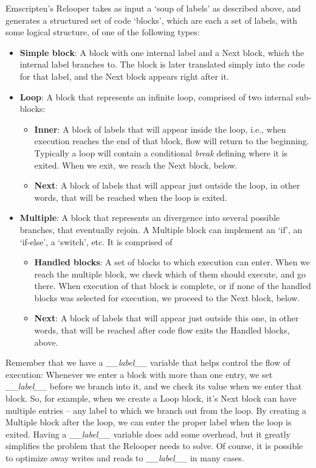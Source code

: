 \documentclass[11pt]{proc}
\begin{document}
Emscripten's Relooper takes as input a `soup of labels' as described above,
and generates a structured set of code `blocks', which are each a set of labels,
with some logical structure, of one of the following types:
\begin{itemize}
\item \textbf{Simple block}: A block with one internal label and a Next
      block, which the internal label branches to. The block is later
      translated simply into the code for that label, and the Next
      block appears right after it.
\item \textbf{Loop}: A block that represents an infinite loop, comprised of
      two internal sub-blocks:
  \begin{itemize}
  \item \textbf{Inner}: A block of labels that will appear inside
        the loop, i.e., when execution reaches the end of that block,
        flow will return to the beginning. Typically a loop will contain
        a conditional \emph{break} defining where it is exited. When we
        exit, we reach the Next block, below.
  \item \textbf{Next}: A block of labels that will appear just outside
        the loop, in other words, that will be reached when the loop is exited.
  \end{itemize}
\item \textbf{Multiple}: A block that represents an divergence into several
      possible branches, that eventually rejoin. A Multiple block can
      implement an `if', an `if-else', a `switch', etc. It is comprised of
  \begin{itemize}
  \item \textbf{Handled blocks}: A set of blocks to which execution can
        enter. When we reach the multiple block, we check which of them
        should execute, and go there. When execution of that block is
        complete, or if none of the handled blocks was selected for
        execution, we proceed to the Next block, below.
  \item \textbf{Next}: A block of labels that will appear just outside
        this one, in other words, that will be reached after code flow
        exits the Handled blocks, above.
  \end{itemize}
\end{itemize}
Remember that we have a \emph{\_\_label\_\_} variable that helps control
the flow of execution: Whenever we enter a block with more than one
entry, we set \emph{\_\_label\_\_} before we branch into it, and we
check its value when we enter that block. So, for example, when we
create a Loop block, it's Next block can have multiple entries -- any
label to which we branch out from the loop. By creating a Multiple
block after the loop, we can enter the proper label when the loop is
exited. Having a \emph{\_\_label\_\_} variable does add some overhead,
but it greatly simplifies the problem that the Relooper needs to solve.
Of course, it is possible to optimize
away writes and reads to \emph{\_\_label\_\_} in many cases.
\end{document}

